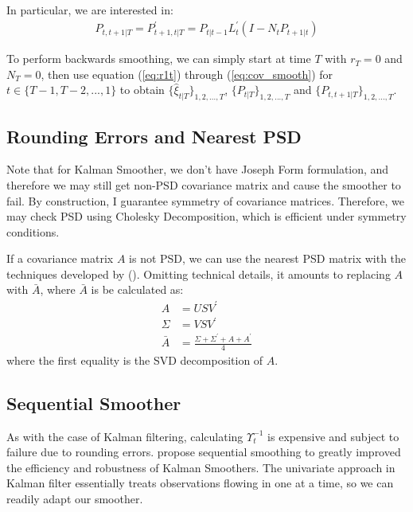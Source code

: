 \documentclass[12pt]{article}
\numberwithin{equation}{section}
\begin{document}
In particular, we are interested in:
\begin{align}
    P_{t,t+1|T} = P_{t+1,t|T}^{'} = P_{t|t-1}L_t^{'}(I-N_tP_{t+1|t}) \label{eq:cov_smooth}
\end{align}

To perform backwards smoothing, we can simply start at time $T$ with $r_T=0$ and $N_T=0$, then use equation (\ref{eq:r1t}) through (\ref{eq:cov_smooth}) for $t\in\{T-1,T-2,...,1\}$ to obtain $\{\hat{\xi}_{t|T}\}_{1,2,...,T}$, $\{P_{t|T}\}_{1,2,...,T}$ and $\{P_{t,t+1|T}\}_{1,2,...,T}$.

\subsection{Rounding Errors and Nearest PSD}
Note that for Kalman Smoother, we don't have Joseph Form formulation, and therefore we may still get non-PSD covariance matrix and cause the smoother to fail. By construction, I guarantee symmetry of covariance matrices. Therefore, we may check PSD using Cholesky Decomposition, which is efficient under symmetry conditions.

If a covariance matrix $A$ is not PSD, we can use the nearest PSD matrix with the techniques developed by (\cite{higham_1988}). Omitting technical details, it amounts to replacing $A$ with $\bar{A}$, where $\bar{A}$ is be calculated as:
\begin{align*}
    A &= USV^{'} \\
    \Sigma &= VSV^{'} \\
    \bar{A} &= \frac{\Sigma + \Sigma^{'} + A + A^{'}}{4}
\end{align*}
where the first equality is the SVD decomposition of $A$.

\subsection{Sequential Smoother}
As with the case of Kalman filtering, calculating $\Upsilon_t^{-1}$ is expensive and subject to failure due to rounding errors. \cite{durbin_koopman_2000} propose sequential smoothing to greatly improved the efficiency and robustness of Kalman Smoothers. The univariate approach in Kalman filter essentially treats observations flowing in one at a time, so we can readily adapt our smoother.
\end{document}
